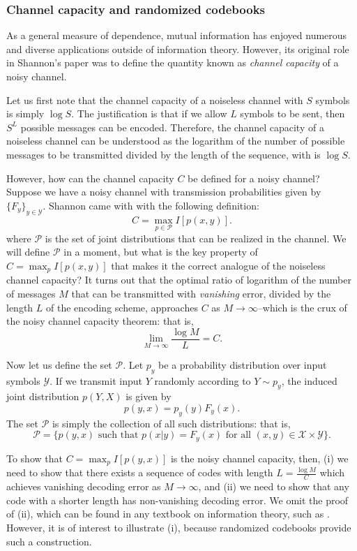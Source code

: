 \subsubsection{Channel capacity and randomized codebooks}

As a general measure of dependence, mutual information has enjoyed
numerous and diverse applications outside of information theory.
However, its original role in Shannon's paper was to define the
quantity known as \emph{channel capacity} of a noisy channel.

Let us first note that the channel capacity of a noiseless channel
with $S$ symbols is simply $\log S$.  The justification is that if we
allow $L$ symbols to be sent, then $S^L$ possible messages can be
encoded.  Therefore, the channel capacity of a noiseless channel can
be understood as the logarithm of the number of possible messages to
be transmitted divided by the length of the sequence, with is $\log
S$.


However, how can the channel capacity $C$ be defined for a noisy channel?
Suppose we have a noisy channel with transmission probabilities given by $\{F_y\}_{y \in \mathcal{Y}}$.
Shannon came with with the following definition:
\[
C = \max_{p\in \mathcal{P}} I[p(x,y)].
\]
where $\mathcal{P}$ is the set of joint distributions that can be
realized in the channel.  We will define $\mathcal{P}$ in a moment,
but what is the key property of $C = \max_p I[p(x,y)]$ that makes it
the correct analogue of the noiseless channel capacity?  It turns out
that the optimal ratio of logarithm of the number of messages $M$ that
can be transmitted with \emph{vanishing} error, divided by the length
$L$ of the encoding scheme, approaches $C$ as $M \to \infty$--which is
the crux of the noisy channel capacity theorem: that is,
\[
\lim_{M \to \infty} \frac{\log M}{L} = C.
\]

Now let us define the set $\mathcal{P}$.  Let $p_y$ be a probability
distribution over input symbols $\mathcal{Y}$.  If we transmit input $Y$
randomly according to $Y \sim p_y$, the induced joint distribution $p(Y, X)$
is given by
\[
p(y, x) = p_y(y) F_y(x).
\]
The set $\mathcal{P}$ is simply the collection of all such distributions: that is,
\[
\mathcal{P} = \{p(y, x) \text{ such that } p(x|y) = F_y(x)\text{ for all }(x, y) \in \mathcal{X} \times \mathcal{Y}\}.
\]

To show that $C = \max_p I[p(y, x)]$ is the noisy channel capacity,
then, (i) we need to show that there exists a sequence of codes with
length $L = \frac{\log M}{C}$ which achieves vanishing decoding error
as $M \to \infty$, and (ii) we need to show that any code with a
shorter length has non-vanishing decoding error.  We omit the proof of
(ii), which can be found in any textbook on information theory, such
as \cite{Cover2006}.  However, it is of interest to illustrate (i),
because randomized codebooks provide such a construction.


